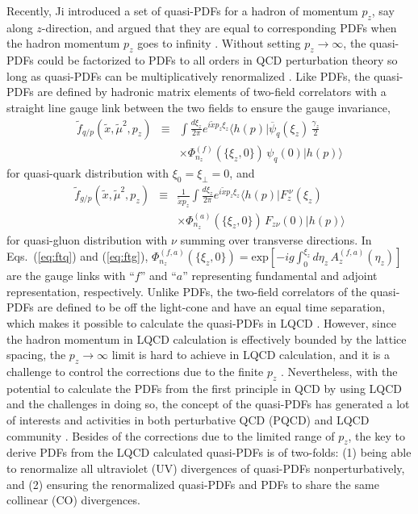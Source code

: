 \documentclass[twocolumn,aps,prd,superscriptaddress,nofootinbib,showpacs]{revtex4}
\begin{document}
Recently, Ji introduced a set of quasi-PDFs for a hadron of momentum $p_z$, say along $z$-direction, and argued that they are equal to corresponding PDFs when the hadron momentum $p_z$ goes to infinity \cite{Ji:2013dva}.
Without setting $p_z\to\infty$, the quasi-PDFs could be factorized to PDFs to all orders in QCD perturbation theory so long as quasi-PDFs can be multiplicatively renormalized \cite{Ma:2014jla}.
Like PDFs, the quasi-PDFs are defined by hadronic matrix elements of two-field correlators with a straight line gauge link between the two fields to ensure the gauge invariance,
\begin{eqnarray}
\label{eq:ftq}
\tilde{f}_{q/p}(\tilde{x},\tilde{\mu}^2,p_z)
&\equiv &
\int \frac{d\xi_z}{2\pi} e^{i \tilde{x}p_z \xi_z}\langle h(p)| \overline{\psi}_q(\xi_z)\,\frac{\gamma_z}{2}
\nonumber\\
&\ & \times
\Phi_{n_z}^{(f)}(\{\xi_z,0\})\, \psi_q(0) | h(p) \rangle
\end{eqnarray}
for quasi-quark distribution with $\xi_0=\xi_\perp=0$, and
\begin{eqnarray}
\label{eq:ftg}
\tilde{f}_{g/p}(\tilde{x},\tilde{\mu}^2,p_z)
&\equiv &
\frac{1}{\tilde{x}p_z}
\int \frac{d\xi_z}{2\pi} e^{i \tilde{x} p_z \xi_z}\langle h(p)| F_{z}^{\ \nu}(\xi_z)\,
\nonumber\\
&\ & \times
\Phi_{n_z}^{(a)}(\{\xi_z,0\})\, F_{z\nu}(0) | h(p) \rangle
\end{eqnarray}
for quasi-gluon distribution with $\nu$ summing over transverse directions.
In Eqs.~(\ref{eq:ftq}) and (\ref{eq:ftg}), $\Phi_{n_z}^{(f,a)}(\{\xi_z,0\}) = \text{exp}[-ig\int_0^{\xi_z} d\eta_z\, A^{(f,a)}_z(\eta_z)]$ are the gauge links with ``$f$'' and ``$a$'' representing fundamental and adjoint representation, respectively.
Unlike PDFs, the two-field correlators of the quasi-PDFs are defined to be off the light-cone and have an equal time separation, which makes it possible to calculate the quasi-PDFs in LQCD \cite{Lin:2014zya,Alexandrou:2015rja,Chen:2016utp,Zhang:2017bzy,Orginos:2017kos}.
However, since the hadron momentum in LQCD calculation is effectively bounded by the lattice spacing, the $p_z\to\infty$ limit is hard to achieve in LQCD calculation, and it is a challenge to control the corrections due to the finite $p_z$ \cite{Ji:2014gla,Ji:2017rah}.  Nevertheless, with the potential to calculate the PDFs from the first principle in QCD by using LQCD and the challenges in doing so, the concept of the quasi-PDFs has generated a lot of interests and activities in both perturbative QCD (PQCD) and LQCD community \cite{Ji:2014hxa,Gamberg:2014zwa,Jia:2015pxx,Li:2016amo,Bacchetta:2016zjm,Radyushkin:2016hsy,Radyushkin:2017gjd,Gbedo:2017eyp,Radyushkin:2017ffo,Carlson:2017gpk,Briceno:2017cpo,Nam:2017gzm,Xiong:2017jtn,Radyushkin:2017cyf,Constantinou:2017sej,Yoon:2017qzo,Rossi:2017muf}.  Besides of the corrections due to the limited range of $p_z$, the key to derive PDFs from the LQCD calculated quasi-PDFs is of two-folds:  (1) being able to renormalize all ultraviolet (UV) divergences of quasi-PDFs nonperturbatively, and (2) ensuring the renormalized quasi-PDFs and PDFs to share the same collinear (CO) divergences.
\end{document}
